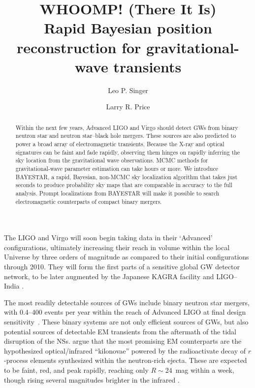 \documentclass[amsmath,amssymb,aps,prx,reprint,nopreprintnumbers,nofootinbib]{revtex4-1}
\begin{document}
\title[Rapid-response Bayesian sky localization]{WHOOMP! (There It Is) \\
Rapid Bayesian position reconstruction for gravitational\nobreakdashes-wave transients}
\author{Leo P. Singer}
\author{Larry R. Price}

\begin{abstract}
Within the next few years, Advanced LIGO and Virgo should detect \acp{GW} from binary neutron star and neutron star\nobreakdashes--black hole mergers. These sources are also predicted to power a broad array of electromagnetic transients. Because the X\nobreakdashes-ray and optical signatures can be faint and fade rapidly, observing them hinges on rapidly inferring the sky location from the gravitational wave observations. MCMC methods for gravitational\nobreakdashes-wave parameter estimation can take hours or more. We introduce BAYESTAR, a rapid, Bayesian, non-MCMC sky localization algorithm that takes just seconds to produce probability sky maps that are comparable in accuracy to the full analysis. Prompt localizations from BAYESTAR will make it possible to search electromagnetic counterparts of compact binary mergers.
\end{abstract}

\maketitle

The \acf{LIGO} and Virgo will soon begin taking data \cite{LIGOObservingScenarios} in their `Advanced' configurations, ultimately increasing their reach in volume within the local Universe by three orders of magnitude as compared to their initial configurations through 2010. They will form the first parts of a sensitive global \ac{GW} detector network, to be later augmented by the Japanese KAGRA facility \cite{LCGT,KAGRAInterferometerDesign} and \ac{LIGO}\nobreakdashes--India \cite{LIGOIndia}.

The most readily detectable sources of \acp{GW} include binary neutron star mergers, with 0.4\nobreakdashes--400 events per year within the reach of Advanced LIGO at final design sensitivity~\cite{rates}. These binary systems are not only efficient sources of \acp{GW}, but also potential sources of detectable \ac{EM} transients from the aftermath of the tidal disruption of the \acp{NS}. \citet{MostPromisingEMCounterpart} argue that the most promising \ac{EM} counterparts are the hypothesized optical/infrared ``kilonovae'' powered by the radioactivate decay of $r$\nobreakdashes-process elements synthesized within the neutron\nobreakdashes-rich ejecta. These are expected to be faint, red, and peak rapidly, reaching only $R \sim 24$~mag within a week, though rising several magnitudes brighter in the infrared \citep{KilonovaHighOpacities}.
\end{document}
